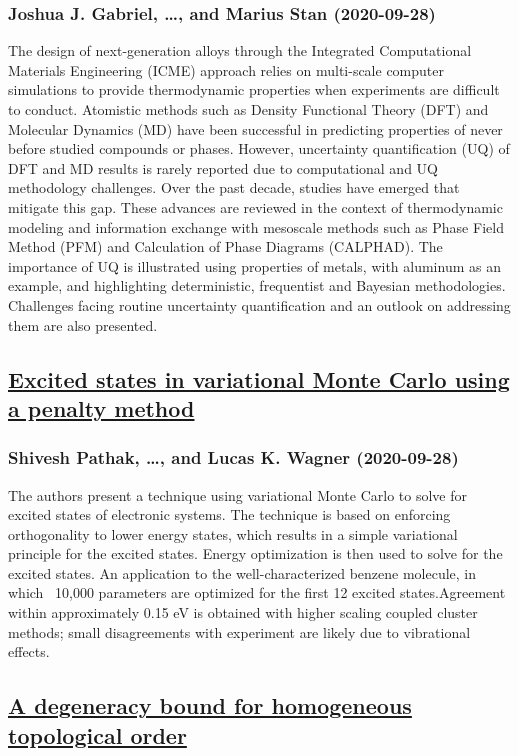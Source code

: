 \subsubsection*{Joshua J. Gabriel, \dots, and Marius Stan (2020-09-28)}
The design of next-generation alloys through the Integrated Computational
Materials Engineering (ICME) approach relies on multi-scale computer
simulations to provide thermodynamic properties when experiments are difficult
to conduct. Atomistic methods such as Density Functional Theory (DFT) and
Molecular Dynamics (MD) have been successful in predicting properties of never
before studied compounds or phases. However, uncertainty quantification (UQ) of
DFT and MD results is rarely reported due to computational and UQ methodology
challenges. Over the past decade, studies have emerged that mitigate this gap.
These advances are reviewed in the context of thermodynamic modeling and
information exchange with mesoscale methods such as Phase Field Method (PFM)
and Calculation of Phase Diagrams (CALPHAD). The importance of UQ is
illustrated using properties of metals, with aluminum as an example, and
highlighting deterministic, frequentist and Bayesian methodologies. Challenges
facing routine uncertainty quantification and an outlook on addressing them are
also presented.

\subsection*{\href{http://arxiv.org/abs/2009.13556v1}{Excited states in variational Monte Carlo using a penalty method}}
\subsubsection*{Shivesh Pathak, \dots, and Lucas K. Wagner (2020-09-28)}
The authors present a technique using variational Monte Carlo to solve for
excited states of electronic systems. The technique is based on enforcing
orthogonality to lower energy states, which results in a simple variational
principle for the excited states. Energy optimization is then used to solve for
the excited states. An application to the well-characterized benzene molecule,
in which ~10,000 parameters are optimized for the first 12 excited
states.Agreement within approximately 0.15 eV is obtained with higher scaling
coupled cluster methods; small disagreements with experiment are likely due to
vibrational effects.

\subsection*{\href{http://arxiv.org/abs/2009.13551v1}{A degeneracy bound for homogeneous topological order}}
